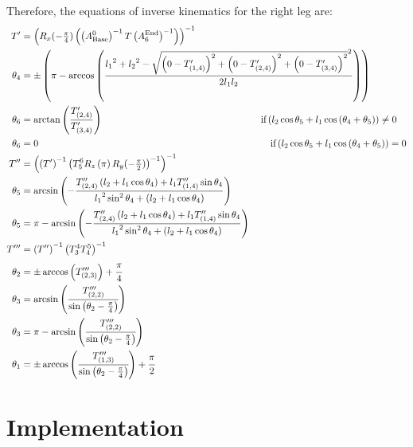 Therefore, the equations of inverse kinematics for the right leg are:
\begin{align*}%
T' &= \left(R_x(-\tfrac{\pi}{4})\left(\left(A^0_\text{Base}\right)^{-1} T \left(A^\text{End}_6\right)^{-1}\right)\right)^{-1} \\
\theta_4 &=\pm\left(\pi - \arccos\left(\frac{{l_1}^2 + {l_2}^2 - \sqrt{\left(0-T'_{(1,4)}\right)^2 + \left(0-T'_{(2,4)}\right)^2 + \left(0-T'_{(3,4)}\right)^2}^2}{2 l_1 l_2}\right)\right) \\
\theta_6 &= \arctan\left(\frac{T'_{(2,4)}}{T'_{(3,4)}}\right)\hspace{5.78cm}\text{if} \left(l_2\cos\theta_5 + l_1 \cos\left(\theta_4 + \theta_5\right)\right) \neq 0 \\
\theta_6 &= 0 \hspace{8.5cm}\text{if} \left(l_2\cos\theta_5 + l_1 \cos\left(\theta_4 + \theta_5\right)\right) = 0 \\
T'' &= \left(\left(T'\right)^{-1}\left(T^6_5R_z\left(\pi\right)R_y(-\tfrac{\pi}{2})\right)^{-1}\right)^{-1} \\
\theta_5 &= \arcsin\left(-\frac{T''_{(2,4)}\left(l_2+l_1\cos\theta_4\right) + l_1T''_{(1,4)}\sin\theta_4}{{l_1}^2\sin^2\theta_4 + \left(l_2 + l_1\cos\theta_4\right)}\right) \\
\theta_5 &= \pi - \arcsin\left(-\frac{T''_{(2,4)}\left(l_2+l_1\cos\theta_4\right) + l_1T''_{(1,4)}\sin\theta_4}{{l_1}^2\sin^2\theta_4 + \left(l_2 + l_1\cos\theta_4\right)}\right)\\
T''' &= \left(T''\right)^{-1}\left(T^4_3T^5_4\right)^{-1} \\
\theta_2 &= \pm\arccos\left(T'''_{(2,3)}\right) + \cfrac{\pi}{4} \\
\theta_3 &= \arcsin\left(\cfrac{T'''_{(2,2)}}{\sin\left(\theta_2 - \frac{\pi}{4}\right)}\right) \\
\theta_3 &= \pi - \arcsin\left(\cfrac{T'''_{(2,2)}}{\sin\left(\theta_2 - \frac{\pi}{4}\right)}\right) \\
\theta_1 &= \pm\arccos\left(\cfrac{T'''_{(1,3)}}{\sin\left(\theta_2 - \frac{\pi}{4}\right)}\right) + \cfrac{\pi}{2}
\end{align*}










\section{Implementation}

